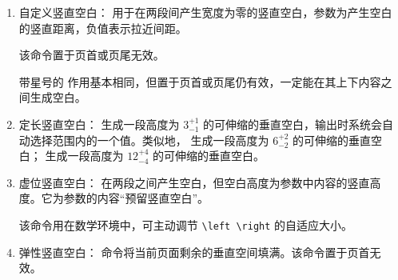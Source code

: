 \begin{enumerate}
效果示例：

\begin{tcolorbox}[sidebyside]
\begin{lstlisting}
chapter1.3 \dotfill filling \\
left \leftarrowfill mid 
     \rightarrowfill right
\end{lstlisting} 

\tcblower

chapter1.3 \dotfill filling\\
left \leftarrowfill mid \rightarrowfill right
\end{tcolorbox}

\item 自定义竖直空白：\boxforcmd{\\vspace{}} 用于在两段间产生宽度为零的竖直空白，参数为产生空白的竖直距离，负值表示拉近间距。

该命令置于页首或页尾无效。

带星号的 \boxforcmd{\\hspace*{}} 作用基本相同，但置于页首或页尾仍有效，一定能在其上下内容之间生成空白。

\item 定长竖直空白：\boxforcmd{\\smallskip} 生成一段高度为 $3^{+1}_{-1}$ 的可伸缩的垂直空白，输出时系统会自动选择范围内的一个值。类似地，\boxforcmd{\\medskip} 生成一段高度为 $6^{+2}_{-2}$ 的可伸缩的垂直空白；\boxforcmd{\\bigskip} 生成一段高度为 $12^{+4}_{-4}$ 的可伸缩的垂直空白。

\item 虚位竖直空白：\boxforcmd{\\vphantom{}} 在两段之间产生空白，但空白高度为参数中内容的竖直高度。它为参数的内容“预留竖直空白”。

该命令用在数学环境中，可主动调节 \verb|\left \right| 的自适应大小。

\item 弹性竖直空白：\boxforcmd{\\vfill} 命令将当前页面剩余的垂直空间填满。该命令置于页首无效。

\end{enumerate}